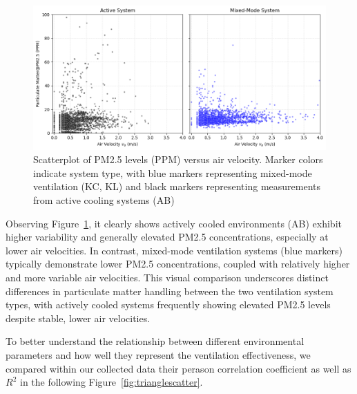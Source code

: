 \documentclass[preprint,12pt]{elsarticle}
\begin{document}
    \begin{figure}[h!]
    \centering
    \includegraphics[width=0.85\linewidth]{img/air_pm.png}
    \caption{Scatterplot of PM2.5 levels (PPM) versus air velocity. Marker colors indicate system type, with blue markers representing mixed-mode ventilation (KC, KL) and black markers representing measurements from active cooling systems (AB)}\label{fig:PMVals}
    \end{figure}

Observing Figure~\ref{fig:PMVals}, it clearly shows actively cooled environments (AB) exhibit higher variability and generally elevated PM2.5 concentrations, especially at lower air velocities. In contrast, mixed-mode ventilation systems (blue markers) typically demonstrate lower PM2.5 concentrations, coupled with relatively higher and more variable air velocities. This visual comparison underscores distinct differences in particulate matter handling between the two ventilation system types, with actively cooled systems frequently showing elevated PM2.5 levels despite stable, lower air velocities.

To better understand the relationship between different environmental parameters and how well they represent the ventilation effectiveness, we compared within our collected data their perason correlation coefficient as well as $R^2$ in the following Figure~\ref{fig:trianglescatter}.
\end{document}
